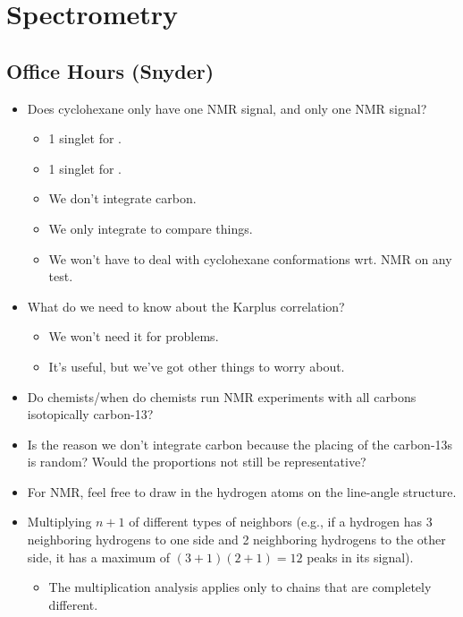 \documentclass[../notes.tex]{subfiles}
\begin{document}
\chapter{Spectrometry}
\section{Office Hours (Snyder)}
\begin{itemize}
    \item {}Does cyclohexane only have one  NMR signal, and only one  NMR signal?
    \begin{itemize}
        \item 1 singlet for .
        \item 1 singlet for .
        \item We don't integrate carbon.
        \item We only integrate to compare things.
        \item We won't have to deal with cyclohexane conformations wrt. NMR on any test.
    \end{itemize}
    \item What do we need to know about the Karplus correlation?
    \begin{itemize}
        \item We won't need it for problems.
        \item It's useful, but we've got other things to worry about.
    \end{itemize}
    \item Do chemists/when do chemists run  NMR experiments with all carbons isotopically carbon-13?
    \item Is the reason we don't integrate carbon because the placing of the carbon-13s is random? Would the proportions not still be representative?
    \item For  NMR, feel free to draw in the hydrogen atoms on the line-angle structure.
    \item Multiplying $n+1$ of different types of neighbors (e.g., if a hydrogen has 3 neighboring hydrogens to one side and 2 neighboring hydrogens to the other side, it has a maximum of $(3+1)(2+1)=12$ peaks in its signal).
    \begin{itemize}
        \item The multiplication analysis applies only to chains that are completely different.
    \end{itemize}
\end{itemize}
\end{document}
